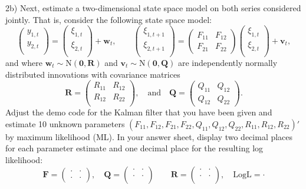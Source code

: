 \documentclass[12pt, a4paper]{article}
\newcommand{\Vv}{\mathbf{v}}
\newcommand{\Ww}{\mathbf{w}}
\newcommand{\FF}{\mathbf{F}}
\newcommand{\QQ}{\mathbf{Q}}
\newcommand{\RR}{\mathbf{R}}
\begin{document}
\medskip\noindent 2b) Next, estimate a two-dimensional state space model on both series considered jointly. That is, consider the following state space model:
\begin{equation}
\label{2d}
\left(
\begin{array}{c}
y_{1,t}\\
y_{2,t}\\
\end{array}
\right)
=
\left(
\begin{array}{c}
\xi_{1,t}\\
\xi_{2,t}\\
\end{array}
\right)+\Ww_t, 
\qquad
\left(
\begin{array}{c}
\xi_{1,t+1}\\
\xi_{2,t+1}\\
\end{array}
\right)
=
\left(
\begin{array}{cc}
F_{11} & F_{12} \\
F_{21} & F_{22}
\end{array}
\right)
\left(
\begin{array}{c}
\xi_{1,t}\\
\xi_{2,t}\\
\end{array}
\right)+\Vv_t, 
\end{equation}
and where $\Ww_t\sim \mathrm{N}(\mathbf{0},\RR)$ and $\Vv_t\sim \mathrm{N}(\mathbf{0},\QQ)$ are independently normally distributed innovations with covariance matrices
\begin{equation}
\label{2d-2}
\RR=\left(
\begin{array}{cc}
R_{11} & R_{12} \\
R_{12} & R_{22}\\
\end{array}
\right),\quad \text{and} \quad
\QQ=\left(
\begin{array}{ccccc}
Q_{11} & Q_{12}  \\
Q_{12} & Q_{22} 
\end{array}
\right).
\end{equation}
 Adjust the demo code for the Kalman filter that you have been given and estimate 10 unknown parameters $(F_{11}, F_{12},F_{21},F_{22},Q_{11},Q_{12},Q_{22},R_{11},R_{12},R_{22})'$ by maximum likelihood (ML). In your answer sheet, display two decimal places for each parameter estimate and one decimal place for the resulting log likelihood:
\[
\FF=\left(
\begin{array}{cc}
\cdot & \cdot \\
\cdot & \cdot
\end{array}
\right),\quad
\QQ=\left(
\begin{array}{cc}
\cdot & \cdot \\
\cdot & \cdot \\
\end{array}
\right)\quad
\quad
\RR=\left(
\begin{array}{cc}
\cdot & \cdot \\
\cdot & \cdot \\
\end{array}
\right),\quad
\mbox{LogL}=\cdot
\]
\end{document}
